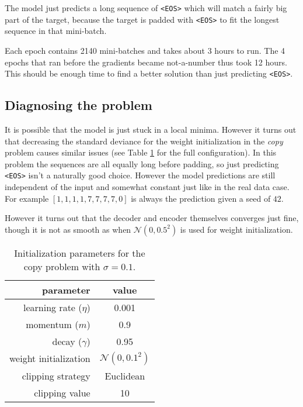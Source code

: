 The model just predicts a long sequence of \texttt{<EOS>} which will match a fairly big part of the target, because the target is padded with \texttt{<EOS>} to fit the longest sequence in that mini-batch.

Each epoch contains 2140 mini-batches and takes about 3 hours to run. The 4 epochs that ran before the gradients became not-a-number thus took 12 hours. This should be enough time to find a better solution than just predicting \texttt{<EOS>}.

\subsection{Diagnosing the problem}

It is possible that the model is just stuck in a local minima. However it turns out that decreasing the standard deviance for the weight initialization in the \textit{copy} problem causes similar issues (see Table \ref{fig:results:sutskever:copy-parameters} for the full configuration). In this problem the sequences are all equally long before padding, so just predicting \texttt{<EOS>} isn't a naturally good choice. However the model predictions are still independent of the input and somewhat constant just like in the real data case. For example $[1, 1,1,1, 7, 7, 7, 7, 0]$ is always the prediction given a seed of $42$.

However it turns out that the decoder and encoder themselves converges just fine, though it is not as smooth as when $\mathcal{N}(0, 0.5^2)$ is used for weight initialization.
\begin{table}[h]
\centering
\begin{tabular}{r|c}
	parameter & value \\ \hline
	learning rate ($\eta$) & 0.001 \\
	momentum ($m$) & 0.9 \\
	decay ($\gamma$) & 0.95 \\
	weight initialization & $\mathcal{N}(0, 0.1^2)$ \\
	clipping strategy & Euclidean \\
	clipping value & 10
\end{tabular}
\caption{Initialization parameters for the copy problem with $\sigma = 0.1$.}
\label{fig:results:sutskever:copy-parameters}
\end{table}

